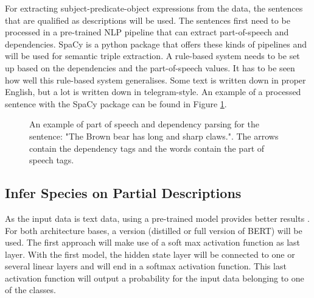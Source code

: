 \documentclass[a4paper, 12pt, oneside]{book} %
\begin{document}
For extracting subject-predicate-object expressions from the data, the sentences that are qualified as descriptions will be used.
The sentences first need to be processed in a pre-trained NLP pipeline that can extract part-of-speech and dependencies.
SpaCy \autocite{honnibal_spacy_2020} is a python package that offers these kinds of pipelines and will be used for semantic triple extraction.
A rule-based system needs to be set up based on the dependencies and the part-of-speech values. 
It has to be seen how well this rule-based system generalises.
Some text is written down in proper English, but a lot is written down in telegram-style.
An example of a processed sentence with the SpaCy package can be found in Figure \ref{fig:PoS_example}.

\begin{figure} [t]
    \centering
    \vspace{0cm}
    \makebox[\textwidth][c]{}
    \caption{An example of part of speech and dependency parsing for the sentence: "The Brown bear has long and sharp claws.". The arrows contain the dependency tags and the words contain the part of speech tags.}
    \label{fig:PoS_example}
\end{figure}

\subsection{Infer Species on Partial Descriptions}
As the input data is text data, using a pre-trained model provides better results \autocite{devlin_bert_2019, sanh_distilbert_2020, mikolov_distributed_2013}.
For both architecture bases, a version (distilled or full version of BERT) will be used.
The first approach will make use of a soft max activation function as last layer.
With the first model, the hidden state layer will be connected to one or several linear layers and will end in a softmax activation function.
This last activation function will output a probability for the input data belonging to one of the classes.
\end{document}
